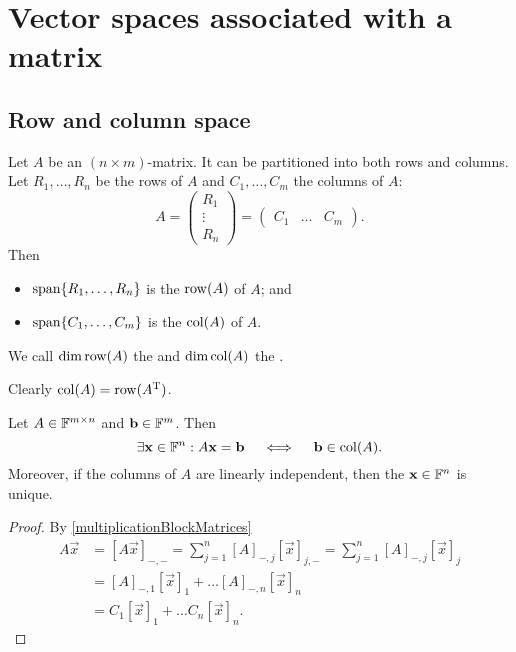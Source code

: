 \section{Vector spaces associated with a matrix}
\subsection{Row and column space}
\begin{definition}
Let $A$ be an $(n\times m)$-matrix. It can be partitioned into both rows and columns. Let $R_1,\ldots, R_n$ be the rows of $A$ and $C_1,\ldots, C_m$ the columns of $A$:
\[ A = \begin{pmatrix}
R_1 \\ \vdots \\ R_n
\end{pmatrix} = \begin{pmatrix}
C_1 & \hdots & C_m
\end{pmatrix}. \]
Then
\begin{itemize}
\item $\operatorname{span}\{R_1,\ldots, R_n\}$ is the  $\operatorname{row}(A)$ of $A$; and
\item $\operatorname{span}\{C_1,\ldots, C_m\}$ is the  $\operatorname{col}(A)$ of $A$.
\end{itemize}
We call $\dim\operatorname{row}(A)$ the  and $\dim\operatorname{col}(A)$ the .
\end{definition}
Clearly $\operatorname{col}(A) = \operatorname{row}(A^{\mathrm{T}})$.

\begin{lemma} \label{columnSpace}
Let $A\in \mathbb{F}^{m\times n}$ and $\boldsymbol{\mathrm{b}}\in \mathbb{F}^m$. Then
\[ \exists \boldsymbol{\mathrm{x}}\in\mathbb{F}^n: A\boldsymbol{\mathrm{x}}=\boldsymbol{\mathrm{b}} \quad\iff\quad \boldsymbol{\mathrm{b}}\in\operatorname{col}(A). \]
Moreover, if the columns of $A$ are linearly independent, then the $\boldsymbol{\mathrm{x}}\in\mathbb{F}^n$ is unique. 
\end{lemma}
\begin{proof}
By \ref{multiplicationBlockMatrices}
\begin{align*}
A\vec{x} &= [A\vec{x}]_{-,-} = \sum_{j=1}^n[A]_{-,j}[\vec{x}]_{j,-} = \sum_{j=1}^n[A]_{-,j}[\vec{x}]_{j} \\
&= [A]_{-,1}[\vec{x}]_1 + \ldots [A]_{-,n}[\vec{x}]_n  \\
&= C_1[\vec{x}]_1 + \ldots C_n[\vec{x}]_n.
\end{align*}
\end{proof}

